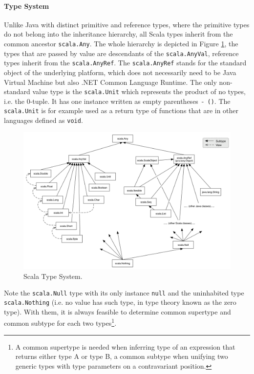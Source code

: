 \documentclass[12pt,a4paper]{report}
\begin{document}
\paragraph{Type System} Unlike Java with distinct primitive and reference types, where the primitive types do not belong into the inheritance hierarchy, all Scala types inherit from the common ancestor \texttt{scala.Any}. The whole hierarchy is depicted in Figure \ref{ScalaTypeSystem}, the types that are passed by value are descendants of the \texttt{scala.AnyVal}, reference types inherit from the \texttt{scala.AnyRef}. The \texttt{scala.AnyRef} stands for the standard object of the underlying platform, which does not necessarily need to be Java Virtual Machine but also .NET Common Language Runtime. The only non-standard value type is the \texttt{scala.Unit} which represents the product of no types, i.e. the 0-tuple. It has one instance written as empty parentheses~-~\texttt{()}. The \texttt{scala.Unit} is for example used as a return type of functions that are in other languages defined as \texttt{void}.

\begin{figure}[ht]
  \centering
	\includegraphics[width=\linewidth,height=\textheight,keepaspectratio]{img/ScalaTypeSystem.png}
	\caption{Scala Type System.}
	\label{ScalaTypeSystem}
\end{figure}

Note the \texttt{scala.Null} type with its only instance \texttt{null} and the uninhabited type \texttt{scala.Nothing} (i.e. no value has such type, in type theory known as the zero type). With them, it is always feasible to determine common supertype and common subtype for each two types\footnote{A common supertype is needed when inferring type of an expression that returns either type A or type B, a common subtype when unifying two generic types with type parameters on a contravariant position.}.
\end{document}
